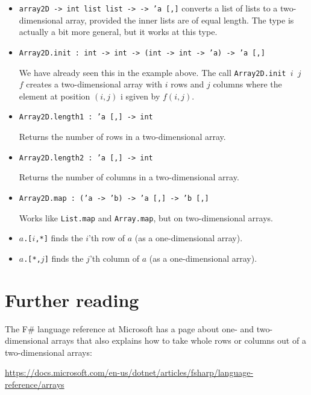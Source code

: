 \documentclass[a4paper]{article}
\begin{document}
\begin{itemize}

\item \texttt{array2D -> int list list -> -> 'a [,]} converts a list
  of lists to a two-dimensional array, provided the inner lists are of
  equal length.  The type is actually a bit more general, but it works
  at this type.

\item \texttt{Array2D.init : int -> int -> (int -> int -> 'a) -> 'a  [,]}

We have already seen this in the example above.  The call
\texttt{Array2D.init $i$ $j$ $f$} creates a two-dimensional array with
$i$ rows and $j$ columns where the element at position $(i,j)$ i
sgiven by $f(i,j)$.

\item \texttt{Array2D.length1 : 'a  [,] -> int}

Returns the number of rows in a two-dimensional array.

\item \texttt{Array2D.length2 : 'a  [,] -> int}

Returns the number of columns in a two-dimensional array.

\item \texttt{Array2D.map : ('a -> 'b) -> 'a [,] -> 'b [,]}

Works like \texttt{List.map} and \texttt{Array.map}, but on
two-dimensional arrays.

\item \texttt{$a$.[$i$,*]} finds the $i$'th row of $a$ (as a
  one-dimensional array).

\item \texttt{$a$.[*,$j$]} finds the $j$'th column of $a$ (as a
  one-dimensional array).


\end{itemize}

\section{Further reading}

The F\# language reference at Microsoft has a page about one- and
two-dimensional arrays that also explains how to take whole rows or
columns out of a two-dimensional arrays:

\url{https://docs.microsoft.com/en-us/dotnet/articles/fsharp/language-reference/arrays}
\end{document}
